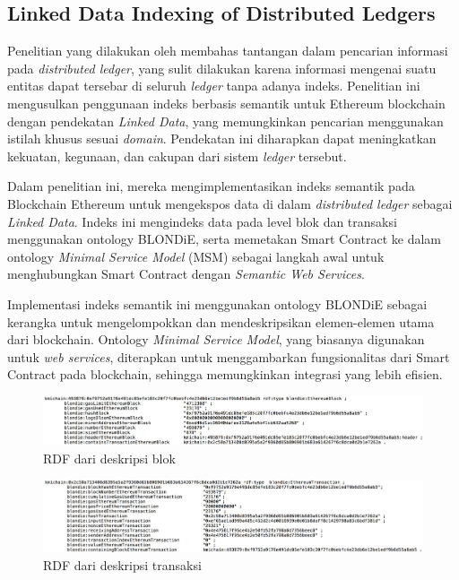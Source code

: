 \subsection{Linked Data Indexing of Distributed Ledgers}
\label{subsec:linked-data-indexing-distributed-ledgers}

Penelitian yang dilakukan oleh \cite{third2017linked} membahas tantangan dalam pencarian informasi pada \textit{distributed ledger}, yang sulit dilakukan karena informasi mengenai suatu entitas dapat tersebar di seluruh \textit{ledger} tanpa adanya indeks. Penelitian ini mengusulkan penggunaan indeks berbasis semantik untuk Ethereum blockchain dengan pendekatan \textit{Linked Data}, yang memungkinkan pencarian menggunakan istilah khusus sesuai \textit{domain}. Pendekatan ini diharapkan dapat meningkatkan kekuatan, kegunaan, dan cakupan dari sistem \textit{ledger} tersebut.

Dalam penelitian ini, mereka mengimplementasikan indeks semantik pada Blockchain Ethereum untuk mengekspos data di dalam \textit{distributed ledger} sebagai \textit{Linked Data}. Indeks ini mengindeks data pada level blok dan transaksi menggunakan ontology BLONDiE, serta memetakan Smart Contract ke dalam ontology \textit{Minimal Service Model} (MSM) sebagai langkah awal untuk menghubungkan Smart Contract dengan \textit{Semantic Web Services}.

Implementasi indeks semantik ini menggunakan ontology BLONDiE sebagai kerangka untuk mengelompokkan dan mendeskripsikan elemen-elemen utama dari blockchain. Ontology \textit{Minimal Service Model}, yang biasanya digunakan untuk \textit{web services}, diterapkan untuk menggambarkan fungsionalitas dari Smart Contract pada blockchain, sehingga memungkinkan integrasi yang lebih efisien.

\begin{figure}[ht]
	\centering
	\includegraphics[width=1\textwidth]{resources/chapter-2/rdf-block.jpg}
	\caption{RDF dari deskripsi blok \parencite{third2017linked}}
	\label{image:rdf-block}
\end{figure}

\begin{figure}[ht]
	\centering
	\includegraphics[width=1\textwidth]{resources/chapter-2/rdf-transaction.jpg}
	\caption{RDF dari deskripsi transaksi \parencite{third2017linked}}
	\label{image:rdf-transaction}
\end{figure}

